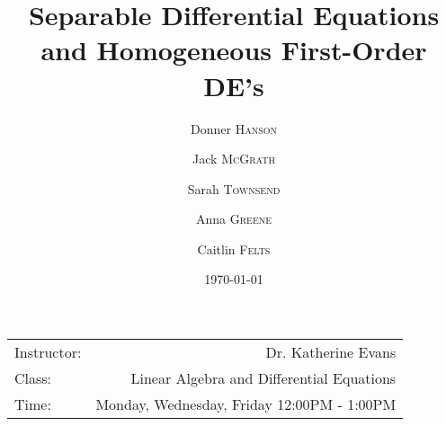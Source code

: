 \documentclass{article}
\title{Separable Differential Equations and Homogeneous First-Order DE’s} %
\author{Donner \textsc{Hanson}\\
\and
Jack \textsc{McGrath}\\
\and
Sarah \textsc{Townsend}
\and
Anna \textsc{Greene}
\and
Caitlin \textsc{Felts}
} %
\date{\today} %
\begin{document}
\maketitle %

\begin{center}
\begin{tabular}{l r}
Instructor: & Dr. Katherine Evans\\%
Class: & Linear Algebra and Differential Equations\\ %
Time: & Monday, Wednesday, Friday 12:00PM - 1:00PM\\
\end{tabular}
\end{center}

\end{document}
